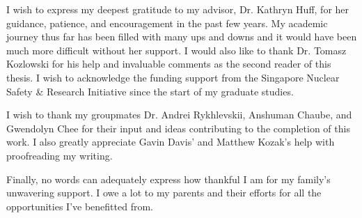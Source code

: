 I wish to express my deepest gratitude to my advisor, Dr. Kathryn Huff, for
her guidance, patience, and encouragement in the past few years. My academic
journey thus far has been filled with many ups and downs and it would have
been much more difficult without her support. I would also like to thank Dr.
Tomasz Kozlowski for his help and invaluable comments as the second reader of
this thesis. I wish to acknowledge the funding support from the Singapore
Nuclear Safety \& Research Initiative since the start of my graduate studies.

I wish to thank my groupmates Dr. Andrei Rykhlevskii, Anshuman Chaube, and
Gwendolyn Chee for their input and ideas contributing to the completion of
this work. I also greatly appreciate Gavin Davis' and Matthew Kozak's help
with proofreading my writing. 

Finally, no words can adequately express how thankful I am for my family's
unwavering support. I owe a lot to my parents and their efforts for all the
opportunities I've benefitted from.